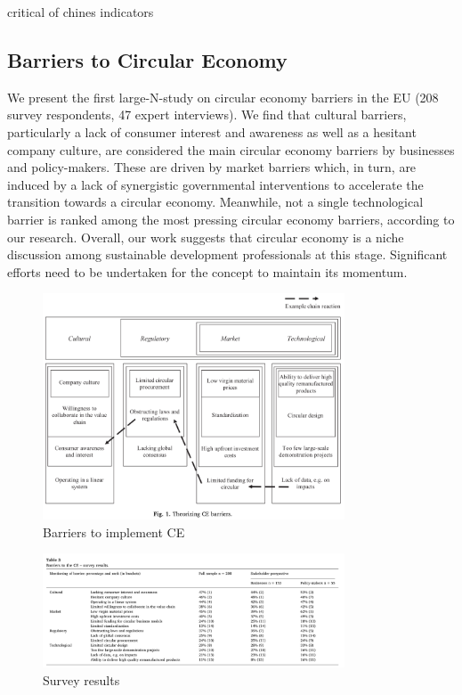 \parencite{eliaMeasuringCircularEconomy2017}
critical of chines indicators


\subsection{Barriers to Circular Economy}


\parencite{Kirchherr2018}

We present the first large-N-study on circular economy barriers in the EU (208 survey respondents, 47 expert interviews). We find that cultural barriers, particularly a lack of consumer interest and awareness as well as a hesitant company culture, are considered the main circular economy barriers by businesses and policy-makers. These are driven by market barriers which, in turn, are induced by a lack of synergistic governmental interventions to accelerate the transition towards a circular economy. Meanwhile, not a single technological barrier is ranked among the most pressing circular economy barriers, according to our research. Overall, our work suggests that circular economy is a niche discussion among sustainable development professionals at this stage. Significant efforts need to be undertaken for the concept to maintain its momentum. \par

\begin{figure}[h!]
    \centering
    \includegraphics[width=0.8\textwidth]{sections/asset/barriers.PNG}
    \caption{Barriers to implement CE}
    \label{fig:ce_BARRIERS}
\end{figure}

\begin{figure}[h!]
    \centering
    \includegraphics[width=0.8\textwidth]{sections/asset/BARRIER_SPECS.PNG}
    \caption{Survey results}
    \label{fig:ce_BARRIERS}
\end{figure}


